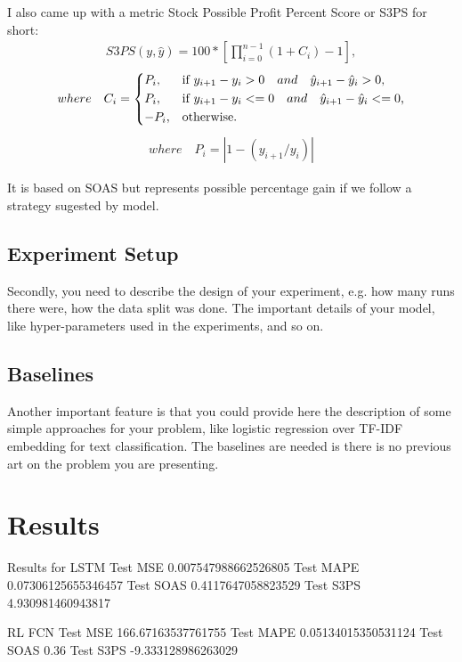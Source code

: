 \documentclass{article}
\begin{document}
I also came up with a metric Stock Possible Profit Percent Score or S3PS for short:
\begin{align}
S3PS(y, \hat{y}) = 100 * [\prod_{i=0}^{n-1}{(1 + C_i)} - 1],
\end{align}
\begin{align}
where \quad C_i = \begin{dcases*}
        P_i, & if $ y_{i+1} - y_{i} > 0  \quad and \quad \hat{y}_{i+1} - \hat{y}_{i} > 0 $,\\
        P_i, & if $ y_{i+1} - y_{i} <= 0  \quad and \quad \hat{y}_{i+1} - \hat{y}_{i} <= 0 $,\\
        -P_i, & otherwise. 
        \end{dcases*} \nonumber 
\end{align}
\begin{align}
where \quad P_i = \left| 1 - (y_{i+1}/y_{i}) \right| \nonumber 
\end{align}

It is based on SOAS but represents possible percentage gain if we follow a strategy sugested by model.


\subsection{Experiment Setup}
Secondly, you need to describe the design of your experiment, e.g. how many runs there were, how the data split was done. The important details of your model, like hyper-parameters used in the experiments, and so on.

\subsection{Baselines}
Another important feature is that you could provide here the description of some simple approaches for your problem, like logistic regression over TF-IDF embedding for text classification. The baselines are needed is there is no previous art on the problem you are presenting.

\section{Results}
\label{sec:results}

Results for LSTM
Test MSE 0.007547988662526805
Test MAPE 0.07306125655346457
Test SOAS 0.4117647058823529
Test S3PS 4.930981460943817


RL FCN
Test MSE 166.67163537761755
Test MAPE 0.05134015350531124
Test SOAS 0.36
Test S3PS -9.333128986263029
\end{document}

